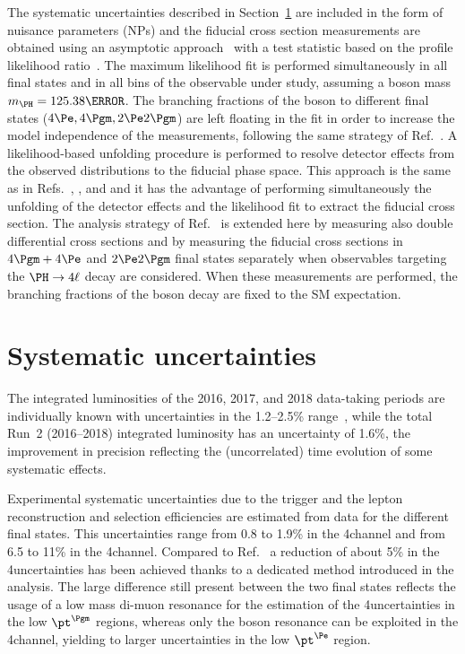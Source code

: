 The systematic uncertainties described in Section~\ref{sec:systematics} are included in the form of nuisance parameters (NPs) and the fiducial cross section measurements are obtained using an asymptotic approach~\cite{LHC-HCG} with a test statistic based on the profile likelihood ratio~\cite{Cowan_2011}.
The maximum likelihood fit is performed simultaneously in all final states and in all bins of the observable under study, assuming a \PH boson mass $\mH=125.38\GeV$.
The branching fractions of the \PH boson to different final states ($4\Pe,4\Pgm,2\Pe2\Pgm$) are left floating in the fit in order to increase the model independence of the measurements, following the same strategy of Ref.~\cite{CMSHIG19001}.
A likelihood-based unfolding procedure is performed to resolve detector effects from the observed distributions to the fiducial phase space. 
This approach is the same as in
Refs.~\cite{Khachatryan:2015yvw}, \cite{CMSHggFiducial8TeV}, and \cite{CMSHIG19001} and it has the advantage of performing simultaneously the unfolding of the detector effects and the likelihood fit to extract the fiducial cross section.
The analysis strategy of Ref.~\cite{CMSHIG19001} is extended here by measuring also double differential cross sections and by measuring the fiducial cross sections in $4\Pgm+4\Pe$ and $2\Pe 2\Pgm$ final states separately when observables targeting the $\Hllll$ decay are considered.
When these measurements are performed, the branching fractions of the \PH boson decay are fixed to the SM expectation.

\section{Systematic uncertainties}
\label{sec:systematics}
The integrated luminosities of the 2016, 2017, and 2018 data-taking periods are individually known with uncertainties in the 1.2--2.5\% range~\cite{CMS-PAS-LUM-17-001,CMS-PAS-LUM-17-004,CMS-PAS-LUM-18-002}, while the total Run~2 (2016--2018) integrated luminosity has an uncertainty of 1.6\%, the improvement in precision reflecting the (uncorrelated) time evolution of some systematic effects. 

Experimental systematic uncertainties due to the trigger and the lepton reconstruction and selection efficiencies are estimated from data for the different final states. 
This uncertainties range from 0.8 to 1.9\% in the 4\Pgm channel and from 6.5 to 11\% in the 4\Pe channel.
Compared to Ref.~\cite{CMSHIG19001} a reduction of about 5\% in the 4\Pe uncertainties has been achieved thanks to a dedicated method introduced in the analysis.
The large difference still present between the two final states reflects the usage of a low mass di-muon resonance for the estimation of the 4\Pgm uncertainties in the low $\pt^{\Pgm}$ regions, whereas only the \PZ boson resonance can be exploited in the 4\Pe channel, yielding to larger uncertainties in the low $\pt^{\Pe}$ region.


